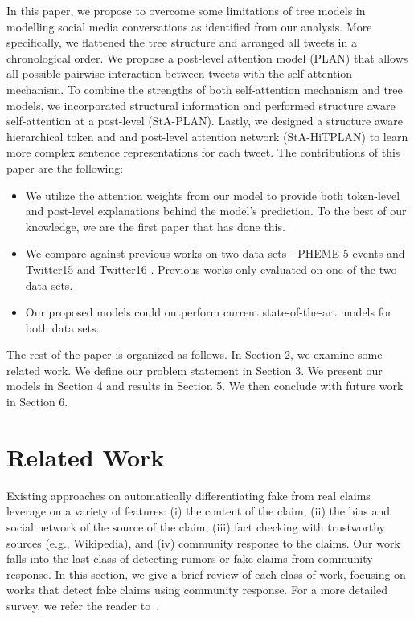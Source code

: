 \documentclass[letterpaper]{article} %
\begin{document}
In this paper, we propose to overcome some limitations of tree models in modelling social media conversations as identified from our analysis. More specifically, we flattened the tree structure and arranged all tweets in a chronological order. We propose a post-level attention model (PLAN) that allows all possible pairwise interaction between tweets with the self-attention mechanism. To combine the strengths of both self-attention mechanism and tree models, we incorporated structural information and performed structure aware self-attention at a post-level (StA-PLAN). Lastly, we designed a structure aware hierarchical token and and post-level attention network (StA-HiTPLAN) to learn more complex sentence representations for each tweet. \newline
\newline
The contributions of this paper are the following:
\begin{itemize}
\item We utilize the attention weights from our model to provide both token-level and post-level explanations behind the model's prediction. To the best of our knowledge, we are the first paper that has done this.
\item We compare against previous works on two data sets - PHEME 5 events \cite{kochkina_liakata_zubiaga_2018} and Twitter15 and Twitter16 \cite{ma17}. Previous works only evaluated on one of the two data sets.
\item  Our proposed models could outperform current state-of-the-art models for both data sets.
\end{itemize}

The rest of the paper is organized as follows. In Section 2, we examine some related work. We define our problem statement in Section 3. We present our models in Section 4 and results in Section 5. We then conclude with future work in Section 6.

\section{Related Work}

Existing approaches on automatically differentiating fake from real claims leverage on a variety of features: (i) the  content of the claim, (ii) the bias and social network of the source of the claim,  (iii) fact checking with trustworthy sources (e.g., Wikipedia), and (iv) community response to the claims. Our work falls into the last class of detecting rumors or fake claims from community response. In this section, we give a brief review of each class of work, focusing on works that detect fake claims using community response. For a more detailed survey, we refer the reader to~\cite{sharma2019}.
\end{document}
